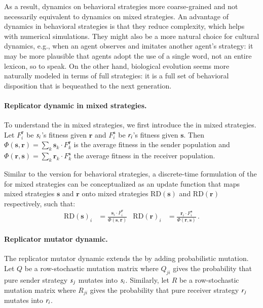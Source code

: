 \documentclass[fleqn,reqno,10pt]{article}
\renewcommand{\Smixed}{\ensuremath{\mathrm{\mathbf{s}}}}
\renewcommand{\Rmixed}{\ensuremath{\mathrm{\mathbf{r}}}}
\newcommand{\rd}{\acro{rd}} %
\newcommand{\rmd}{\acro{rmd}} %
\newcommand{\RD}{\ensuremath{\mathrm{RD}}} %
\begin{document}
As a result, dynamics on behavioral strategies more coarse-grained and
not necessarily equivalent to dynamics on mixed strategies. An
advantage of dynamics in behavioral strategies is that they reduce
complexity, which helps with numerical simulations. They might also be
a more natural choice for cultural dynamics, e.g., when an agent
observes and imitates another agent's strategy: it may be more
plausible that agents adopt the use of a single word, not an entire
lexicon, so to speak. On the other hand, biological evolution seems
more naturally modeled in terms of full strategies: it is a full set
of behavioral disposition that is bequeathed to the next generation.

\paragraph{Replicator dynamic in mixed strategies.} To understand the
\rmd in mixed strategies, we first introduce the \rd in mixed
strategies. Let $F_i^{\Rmixed}$ be $s_i$'s fitness given
$\Rmixed$ and $F_i^{\Smixed}$ be $r_i$'s fitness given
$\Smixed$. Then $\Phi(\Smixed,\Rmixed) = \sum_{k} \Smixed_k \cdot
F_k^{\Rmixed}$ is the average fitness in the sender population and
$\Phi(\Rmixed,\Smixed) = \sum_{k} \Rmixed_k \cdot F_k^{\Smixed}$ the
average fitness in the receiver population.

Similar to the version for behavioral strategies, a discrete-time
formulation of the \rd for mixed strategies can be conceptualized as an
update function that maps mixed strategies $\Smixed$ and $\Rmixed$
onto mixed strategies $\RD(\Smixed)$ and $\RD(\Rmixed)$ respectively,
such that:
\begin{align*}
  \RD(\Smixed)_i & = \frac{\Smixed_i \cdot F_i^{\Rmixed}}{
    \Phi(\Smixed,\Rmixed)} & \RD(\Rmixed)_i & = \frac{\Rmixed_i \cdot
    F_i^{\Smixed}}{ \Phi(\Rmixed,\Smixed)} \,.
\end{align*}


\paragraph{Replicator mutator dynamic.} The replicator mutator dynamic
extends the \rd by adding probabilistic mutation. Let $Q$ be a
row-stochastic mutation matrix where $Q_{ji}$ gives the probability
that pure sender strategy $s_j$ mutates into
$s_i$. Similarly, let $R$ be a row-stochastic mutation matrix
where $R_{ji}$ gives the probability that pure receiver strategy
$r_j$ mutates into $r_i$.
\end{document}
